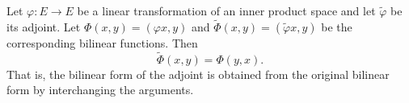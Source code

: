 Let $\varphi: E \rightarrow E$ be a linear transformation of an inner product space and let $\tilde{\varphi}$ be its adjoint. Let $\Phi(x, y) = (\varphi x, y)$ and $\tilde{\Phi}(x, y) = (\tilde{\varphi} x, y)$ be the corresponding bilinear functions. Then
$$\tilde{\Phi}(x, y) = \Phi(y, x).$$
That is, the bilinear form of the adjoint is obtained from the original bilinear form by interchanging the arguments.
